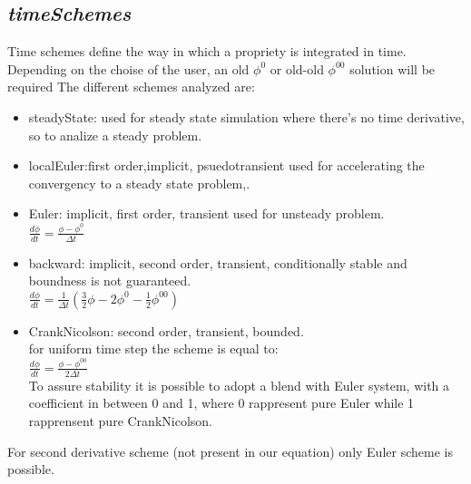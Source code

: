 \documentclass[a4paper,12pt]{article}
\begin{document}
\subsection{\textit{timeSchemes}}
Time schemes define the way in which a propriety is integrated in time. Depending on the choise of the user, an old $\phi^0$ or old-old $\phi^{00}$ solution will be required
The different schemes analyzed are:
\begin{itemize} 
 \item {\ttfamily steadyState}: used for steady state simulation where there's no time derivative, so to analize a steady problem.
 
 \item {\ttfamily localEuler}:first order,implicit, psuedotransient used for accelerating the convergency to a steady state problem,.
 
 \item {\ttfamily Euler}: implicit, first order, transient used for unsteady problem.
 \\$ \frac{d \phi}{dt} = \frac{\phi - \phi^0}{\Delta t}$
 
 \item {\ttfamily backward}: implicit, second order, transient, conditionally stable and boundness is not guaranteed.
 \\$ \frac{d \phi}{dt} = \frac{1}{\Delta t}(\frac{3}{2}\phi - 2\phi^0- \frac{1}{2}\phi^{00})$
 
 \item {\ttfamily CrankNicolson}: second order, transient, bounded. \\for uniform time step the scheme is equal to:
 \\$ \frac{d \phi}{dt} = \frac{\phi - \phi^{00}}{2\Delta t}$
\\To assure stability it is possible to adopt a blend with Euler system, with a coefficient in between 0 and 1, where 0 rappresent pure Euler while 1 rapprensent pure CrankNicolson.
 
 \end{itemize} 

For second derivative scheme (not present in our equation) only Euler scheme is possible.
\end{document}
